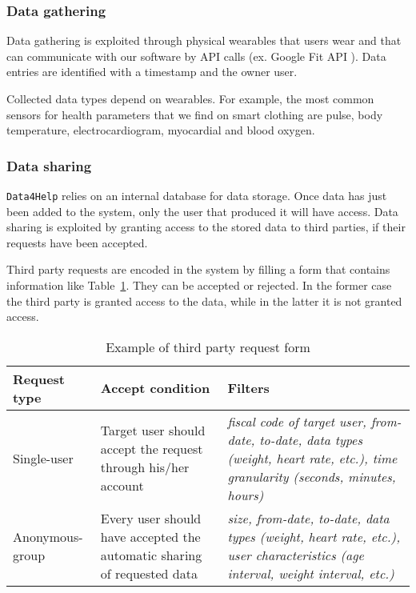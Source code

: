     \subsubsection{Data gathering}
    \label{sec:datagathering}

      Data gathering is exploited through physical wearables that users wear and that can communicate with our software by API calls (ex. Google Fit API \cite{googlefitapi}). Data entries are identified with a timestamp and the owner user.

      Collected data types depend on wearables. For example, the most common sensors for health parameters that we find on smart clothing \cite{sensors} are pulse, body temperature, electrocardiogram, myocardial and blood oxygen.

    \subsubsection{Data sharing}

      \texttt{Data4Help} relies on an internal database for data storage. Once data has just been added to the system, only the user that produced it will have access. Data sharing is exploited by granting access to the stored data to third parties, if their requests have been accepted.

      Third party requests are encoded in the system by filling a form that contains information like Table~\ref{tab:tprequest}. They can be accepted or rejected. In the former case the third party is granted access to the data, while in the latter it is not granted access.

      \begin{table}[h!]
        \centering
        \begin{tabularx}{\linewidth}{|l|X|X|}
          \hline
          \textbf{Request type} & \textbf{Accept condition}                                               & \textbf{Filters}                                                                                                                           \\ \hline
          Single-user           & Target user should accept the request through his/her account                                   & \textit{fiscal code of target user, from-date, to-date, data types (weight, heart rate, etc.), time granularity (seconds, minutes, hours)} \\ \hline
          Anonymous-group       & Every user should have accepted the automatic sharing of requested data & \textit{size, from-date, to-date, data types (weight, heart rate, etc.), user characteristics (age interval, weight interval, etc.)}       \\ \hline
        \end{tabularx}
        \caption{Example of third party request form}
        \label{tab:tprequest}
      \end{table}

